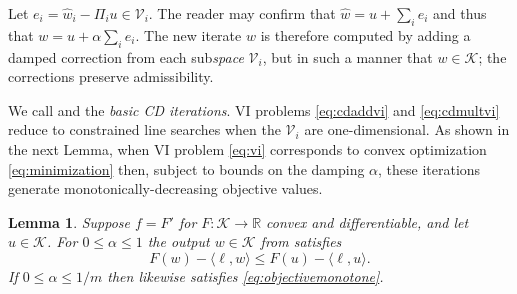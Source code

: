 \documentclass[letterpaper,final,12pt,reqno]{amsart}
\theoremstyle{cstyle}
\newtheorem{lemma}[theorem]{Lemma}
\theoremstyle{cstyle*}
\theoremstyle{dstyle}
\numberwithin{equation}{section}
\numberwithin{figure}{section}
\numberwithin{table}{section}
\numberwithin{theorem}{section}
\newcommand{\RR}{\mathbb{R}}
\newcommand{\cK}{\mathcal{K}}
\newcommand{\cV}{\mathcal{V}}
\newcommand{\ip}[2]{\langle#1,#2\rangle}
\begin{document}
Let $e_i = \hat w_i - \Pi_i u \in \cV_i$.  The reader may confirm that $\hat w = u + \sum_{i} e_i$ and thus that $w = u + \alpha \sum_i e_i$.  The new iterate $w$ is therefore computed by adding a damped correction from each sub\emph{space} $\mathcal{V}_i$, but in such a manner that $w \in \mathcal{K}$; the corrections preserve admissibility.

We call  and  the \emph{basic CD iterations}.  VI problems \eqref{eq:cdaddvi} and \eqref{eq:cdmultvi} reduce to constrained line searches when the $\cV_i$ are one-dimensional.  As shown in the next Lemma, when VI problem \eqref{eq:vi} corresponds to convex optimization \eqref{eq:minimization} then, subject to bounds on the damping $\alpha$, these iterations generate monotonically-decreasing objective values.
\begin{lemma} \cite{Tai2003}  Suppose $f=F'$ for $F:\cK\to\RR$ convex and differentiable, and let $u\in\cK$.  For $0 \le \alpha \le 1$ the output $w \in \cK$ from  satisfies
\begin{equation}
F(w) - \ip{\ell}{w} \le F(u) - \ip{\ell}{u}.  \label{eq:objectivemonotone}
\end{equation}
If $0 \le \alpha \le 1/m$ then  likewise satisfies \eqref{eq:objectivemonotone}.
\end{lemma}
\end{document}
